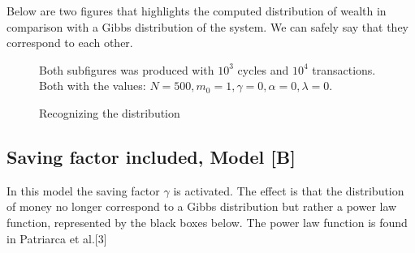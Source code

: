 \documentclass[a4paper,11pt]{article}
\begin{document}
Below are two figures that highlights the computed distribution of wealth in comparison with a Gibbs distribution of the system. We can safely say that they correspond to each other.
\begin{figure}[H]
  \hfill
  \caption{Recognizing the distribution}
{\small Both subfigures was produced with $10^3$ cycles and $10^4$ transactions. \\Both with the values: $N = 500, m_0 = 1, \gamma = 0, \alpha = 0, \lambda = 0$. }
\end{figure}


	\subsection{Saving factor included, Model [B]}
In this model the saving factor $\gamma$ is activated. The effect is that the distribution of money no longer correspond to a Gibbs distribution but rather a power law function, represented by the black boxes below. The power law function is found in Patriarca et al.[3]	
	
\end{document}
